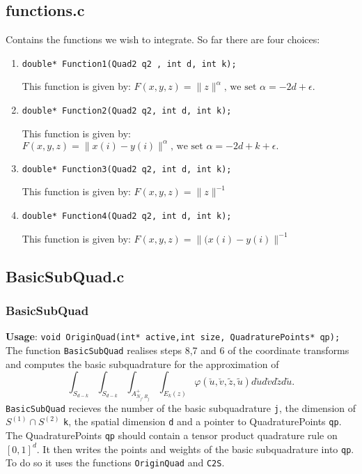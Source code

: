 \documentclass[a4paper,10pt]{article}
\begin{document}
\subsection{functions.c}
Contains the functions we wish to integrate. So far there are four choices:
\begin{enumerate}
\item \begin{verbatim}double* Function1(Quad2 q2 , int d, int k);    \end{verbatim}
       This function is given by: $F(x,y,z)=\|z\| ^{\alpha}\text{, we set }\alpha=-2d+\epsilon.$
\item \begin{verbatim}double* Function2(Quad2 q2, int d, int k);    \end{verbatim}
       This function is given by: $F(x,y,z)=\|x(i)-y(i)\| ^{\alpha}\text{, we set }\alpha=-2d+k+\epsilon.$
\item \begin{verbatim}double* Function3(Quad2 q2, int d, int k);    \end{verbatim}
       This function is given by: $F(x,y,z)=\|z\| ^{-1}$
\item \begin{verbatim}double* Function4(Quad2 q2, int d, int k);    \end{verbatim}
       This function is given by: $F(x,y,z)=\|(x(i)-y(i)\| ^{-1}$
\end{enumerate}

\subsection{BasicSubQuad.c}
\subsubsection{BasicSubQuad}
\textbf{Usage}: \verb=void OriginQuad(int* active,int size, QuadraturePoints* qp);=\\
The function \verb=BasicSubQuad= realises steps 8,7 and 6 of the coordinate transforms and computes 
the basic subquadrature for the approximation of 
\begin{displaymath}
 \int_{S_{d-k}} \int_{S_{d-k}} \int_{A^+_{N_j,R_j}} \int_{E_k(z)} \varphi 
                     (\check{u},\check{v},\tilde{z},\tilde{u}) d\check{u}d\check{v}d\tilde{z}d\tilde{u}.
\end{displaymath}
\verb=BasicSubQuad= recieves the number of the basic subquadrature \verb=j=, the dimension of
 $S^{(1)}\cap S^{(2)}$ \verb=k=, the spatial dimension \verb=d= and a pointer to QuadraturePoints \verb=qp=. 
The QuadraturePoints \verb=qp= should contain a tensor product quadrature rule on $ [0,1]^d$.
It then writes the points and weights of the basic subquadrature into \verb=qp=. To do so it uses the 
functions \verb=OriginQuad= and \verb=C2S=.
\end{document}
